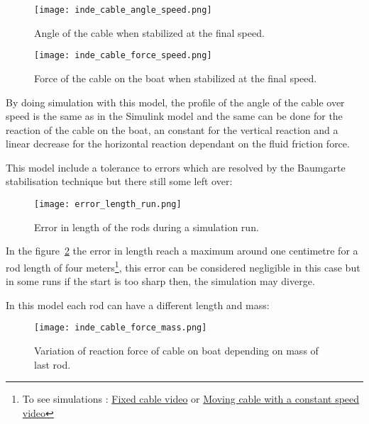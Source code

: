 \begin{figure}[H]
\centering
    \begin{minipage}[b]{0.4\textwidth}
    \centering
    \texttt{[image: inde\_cable\_angle\_speed.png]}
    \caption{Angle of the cable when stabilized at the final speed.}
    \label{fig:angleIndSpeed}
    \end{minipage}
    \hfill
    \begin{minipage}[b]{0.45\textwidth}
    \centering
    \texttt{[image: inde\_cable\_force\_speed.png]}
    \caption{Force of the cable on the boat when stabilized at the final speed.}
    \label{fig:forceIndSpeed}
    \end{minipage}
\end{figure}

By doing simulation with this model, the profile of the angle of the cable over speed is the same as in the Simulink model and the same can be done for the reaction of the cable on the boat, an constant for the vertical reaction and a linear decrease for the horizontal reaction dependant on the fluid friction force.

This model include a tolerance to errors which are resolved by the Baumgarte stabilisation technique but 
there still some left over:


\begin{figure}[H]
\centering
    \texttt{[image: error\_length\_run.png]}
    \caption{Error in length of the rods during a simulation run.}
    \label{fig:errorLRod}
\end{figure}

In the figure~\ref{fig:errorLRod} the error in length reach a maximum around one centimetre for a rod length of four meters\footnote{To see simulations : \href{https://www.youtube.com/watch?v=T7DRGq3E5x8}{Fixed cable video} or \href{https://www.youtube.com/watch?v=V4X0PsgsXZY to see simulations}{Moving cable with a constant speed video}}, this error can be considered negligible in this case but in some runs if the start is too sharp then, the simulation may diverge.

In this model each rod can have a different length and mass:

\begin{figure}[H]
\centering
    \texttt{[image: inde\_cable\_force\_mass.png]}
    \caption{Variation of reaction force of cable on boat depending on mass of last rod.}
    \label{fig:massForce}
\end{figure}

